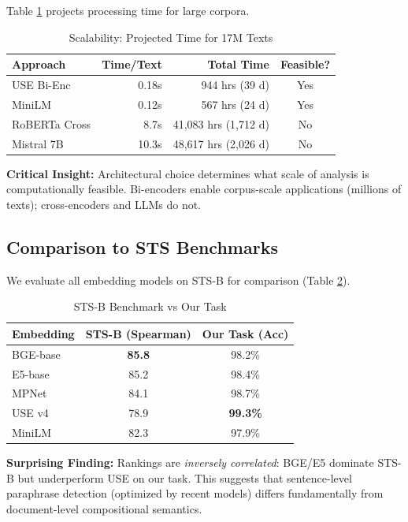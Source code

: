 \documentclass[11pt,a4paper]{article}
\begin{document}
Table \ref{tab:scalability} projects processing time for large corpora.

\begin{table}[h]
\centering
\small
\caption{Scalability: Projected Time for 17M Texts}
\label{tab:scalability}
\begin{tabular}{lrrc}
\toprule
\textbf{Approach} & \textbf{Time/Text} & \textbf{Total Time} & \textbf{Feasible?} \\
\midrule
USE Bi-Enc & 0.18s & 944 hrs (39 d) & Yes \\
MiniLM & 0.12s & 567 hrs (24 d) & Yes \\
RoBERTa Cross & 8.7s & 41,083 hrs (1,712 d) & No \\
Mistral 7B & 10.3s & 48,617 hrs (2,026 d) & No \\
\bottomrule
\end{tabular}
\end{table}

\textbf{Critical Insight:} Architectural choice determines what scale of analysis is computationally feasible. Bi-encoders enable corpus-scale applications (millions of texts); cross-encoders and LLMs do not.

\subsection{Comparison to STS Benchmarks}

We evaluate all embedding models on STS-B \cite{Cer2017SemEval} for comparison (Table \ref{tab:sts_comparison}).

\begin{table}[h]
\centering
\small
\caption{STS-B Benchmark vs Our Task}
\label{tab:sts_comparison}
\begin{tabular}{lcc}
\toprule
\textbf{Embedding} & \textbf{STS-B (Spearman)} & \textbf{Our Task (Acc)} \\
\midrule
BGE-base & \textbf{85.8} & 98.2\% \\
E5-base & 85.2 & 98.4\% \\
MPNet & 84.1 & 98.7\% \\
USE v4 & 78.9 & \textbf{99.3\%} \\
MiniLM & 82.3 & 97.9\% \\
\bottomrule
\end{tabular}
\end{table}

\textbf{Surprising Finding:} Rankings are \textit{inversely correlated}: BGE/E5 dominate STS-B but underperform USE on our task. This suggests that sentence-level paraphrase detection (optimized by recent models) differs fundamentally from document-level compositional semantics.
\end{document}
